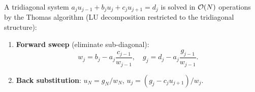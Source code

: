 A tridiagonal system $a_j u_{j-1} + b_j u_j + c_j u_{j+1} = d_j$
is solved in $\mathcal{O}\!\left(N\right)$ operations by the Thomas algorithm (LU
decomposition restricted to the tridiagonal structure):

\begin{enumerate}
  \item \textbf{Forward sweep} (eliminate sub-diagonal):
        \begin{equation}
          w_j = b_j - a_j\frac{c_{j-1}}{w_{j-1}}, \quad
          g_j = d_j - a_j\frac{g_{j-1}}{w_{j-1}}.
          \label{eq:lec17:thomas_fwd}
        \end{equation}
  \item \textbf{Back substitution}:
        $u_N = g_N/w_N$,\quad
        $u_j = (g_j - c_j u_{j+1})/w_j$.
\end{enumerate}

